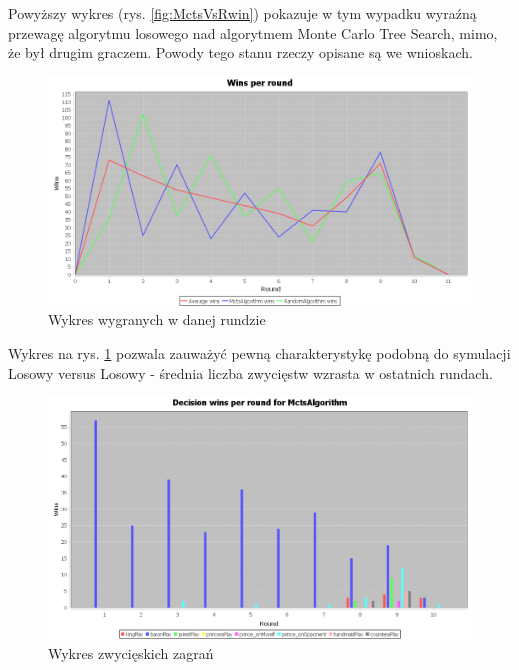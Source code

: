 Powyższy wykres (rys. \ref{fig:MctsVsRwin}) pokazuje w tym wypadku wyraźną przewagę algorytmu losowego nad algorytmem Monte Carlo Tree Search, mimo, że był drugim graczem. Powody tego stanu rzeczy opisane są we wnioskach.

\begin{figure}[H]
	\centering
	\includegraphics[width=\textwidth]{Resources/MctsVsR/MctsVsRroundwin.PNG}
	\caption{Wykres wygranych w danej rundzie} 
	\label{fig:MctsVsRroundwin}
\end{figure}

Wykres na rys. \ref{fig:MctsVsRroundwin} pozwala zauważyć pewną charakterystykę podobną do symulacji Losowy versus Losowy - średnia liczba zwycięstw wzrasta w ostatnich rundach.

\begin{figure}[H]
	\centering
	\includegraphics[width=\textwidth]{Resources/MctsVsR/MctsVsRdecision.PNG}
	\caption{Wykres zwycięskich zagrań} 
	\label{fig:MctsVsRdecision}
\end{figure} 


